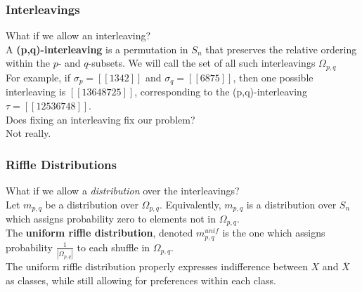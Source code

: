 \documentclass{beamer} %
\theoremstyle{definition} %
\def \pausenl {\pause $ \ $\\}
\begin{document}
\begin{frame}
	\frametitle{Interleavings}
	
	What if we allow an interleaving?\\
	$\ $\\
	
	A \textbf{(p,q)-interleaving} is a permutation in $S_n$ that preserves the relative ordering within the $p$- and $q$-subsets.  We will call the set of all such interleavings $\Omega_{p,q}$\\
	
	\pausenl
	
	For example, if $\sigma_p = [[1342]]$ and $\sigma_q = [[6875]]$, then one possible interleaving is $[[13648725]]$, corresponding to the (p,q)-interleaving $\tau = [[12536748]]$.\\
	
	\pausenl
	
	Does fixing an interleaving fix our problem?
	\pausenl
	Not really. 
	
\end{frame}

\begin{frame}
	\frametitle{Riffle Distributions}
	
	What if we allow a \textit{distribution} over the interleavings?\\
	
	\pausenl
	
	Let $m_{p,q}$  be a distribution over $\Omega_{p,q}$.  Equivalently, $m_{p,q}$ is a distribution over $S_n$ which assigns probability zero to elements not in $\Omega_{p,q}$.\\
	
	\pausenl
	
	The \textbf{uniform riffle distribution}, denoted $m_{p,q}^{unif}$ is the one which assigns probability $\frac{1}{|\Omega_{p,q}|}$ to each shuffle in $\Omega_{p,q}$.\\
	
	\pausenl
	
	The uniform riffle distribution properly expresses indifference between $X$ and $\overline{X}$ as classes, while still allowing for preferences within each class.
	
\end{frame}
\end{document}
